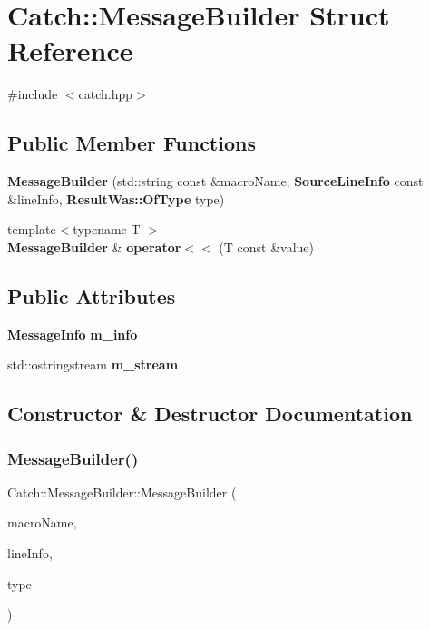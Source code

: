 \section{Catch\+:\+:Message\+Builder Struct Reference}
\label{struct_catch_1_1_message_builder}


{\ttfamily \#include $<$catch.\+hpp$>$}

\subsection*{Public Member Functions}
\begin{DoxyCompactItemize}
\item 
\textbf{ Message\+Builder} (std\+::string const \&macro\+Name, \textbf{ Source\+Line\+Info} const \&line\+Info, \textbf{ Result\+Was\+::\+Of\+Type} type)
\item 
{\footnotesize template$<$typename T $>$ }\\\textbf{ Message\+Builder} \& \textbf{ operator$<$$<$} (T const \&value)
\end{DoxyCompactItemize}
\subsection*{Public Attributes}
\begin{DoxyCompactItemize}
\item 
\textbf{ Message\+Info} \textbf{ m\+\_\+info}
\item 
std\+::ostringstream \textbf{ m\+\_\+stream}
\end{DoxyCompactItemize}


\subsection{Constructor \& Destructor Documentation}
\mbox{\label{struct_catch_1_1_message_builder_ab0c6378e722680bf58852c6ee2b6e724}} 
\subsubsection{Message\+Builder()}
{\footnotesize\ttfamily Catch\+::\+Message\+Builder\+::\+Message\+Builder (\begin{DoxyParamCaption}\item[{std\+::string const \&}]{macro\+Name,  }\item[{\textbf{ Source\+Line\+Info} const \&}]{line\+Info,  }\item[{\textbf{ Result\+Was\+::\+Of\+Type}}]{type }\end{DoxyParamCaption})\hspace{0.3cm}{\ttfamily [inline]}}



